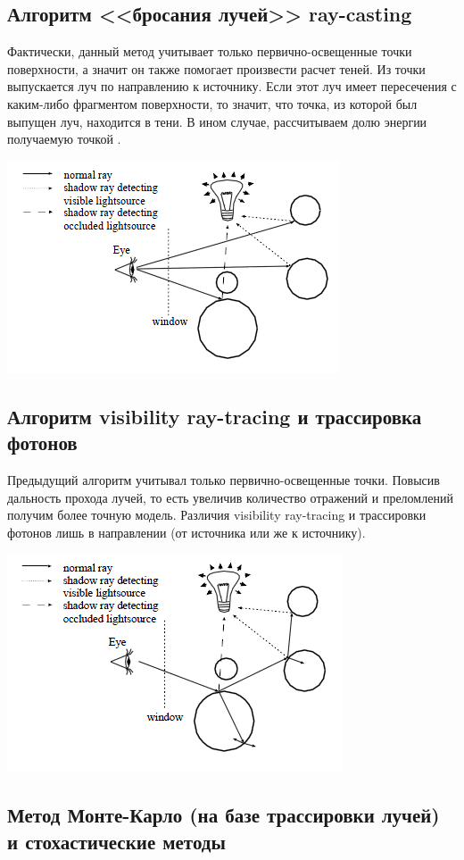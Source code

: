\subsection*{Алгоритм <<бросания лучей>> ray-casting}

Фактически, данный метод учитывает только первично-освещенные точки поверхности, а значит он также помогает произвести расчет теней. Из точки выпускается луч по направлению к источнику. Если этот луч имеет пересечения с каким-либо фрагментом поверхности, то значит, что точка, из которой был выпущен луч, находится в тени. В ином случае, рассчитываем долю энергии получаемую точкой \cite{history}.

\begin{center}
\includegraphics[width=0.5\linewidth]{ray-casting.png}
\end{center}

\subsection*{Алгоритм visibility ray-tracing и трассировка фотонов}

Предыдущий алгоритм учитывал только первично-освещенные точки. Повысив дальность прохода лучей, то есть увеличив количество отражений и преломлений получим более точную модель. Различия visibility ray-tracing и трассировки фотонов лишь в направлении (от источника или же к источнику). 

\begin{center}
\includegraphics[width=0.5\linewidth]{ray-tracing.png}
\end{center}

\subsection*{Метод Монте-Карло (на базе трассировки лучей) и стохастические методы}

